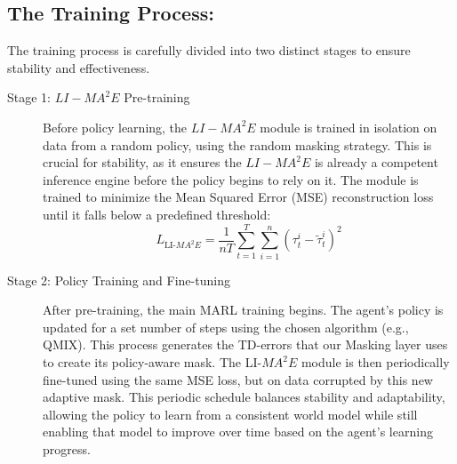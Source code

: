 \subsection{The Training Process:}
The training process is carefully divided into two distinct stages to ensure stability and effectiveness.
\begin{description}
    \item[Stage 1: ${LI-{MA}^2E}$ Pre-training] Before policy learning, the ${LI-{MA}^2E}$ module is trained in isolation on data from a random policy, using the random masking strategy. This is crucial for stability, as it ensures the ${LI-{MA}^2E}$ is already a competent inference engine before the policy begins to rely on it. The module is trained to minimize the Mean Squared Error (MSE) reconstruction loss until it falls below a predefined threshold:
    \begin{equation}
        \label{eq:ma2e_loss}
        L_{\text{LI-${MA}^2E$}} = \frac{1}{nT} \sum_{t=1}^{T} \sum_{i=1}^{n} \left( \tau_t^i - \tilde{\tau}_t^i \right)^2
    \end{equation}
    
    \item[Stage 2: Policy Training and  Fine-tuning] After pre-training, the main MARL training begins. The agent's policy is updated for a set number of steps using the chosen algorithm (e.g., QMIX). This process generates the TD-errors that our Masking  layer  uses to create its  policy-aware mask. The LI-${MA}^2E$  module is then periodically fine-tuned using the same MSE loss, but on data corrupted by this new adaptive mask. This periodic schedule balances stability and adaptability, allowing the policy to learn from a consistent world model while still enabling that model to improve over time based on the agent's learning progress.
\end{description}


